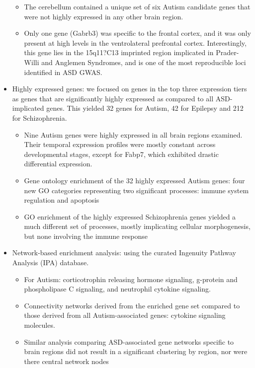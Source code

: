 \documentclass{report}
\begin{document}
\begin{itemize}
\begin{itemize}
		\item The cerebellum contained a unique set of six Autism candidate genes that were not highly expressed in any other brain region. 
		
		\item Only one gene (Gabrb3) was specific to the frontal cortex, and it was only present at high levels in the ventrolateral prefrontal cortex. Interestingly, this gene lies in the 15q11?C13 imprinted region implicated in Prader-Willi and Anglemen Syndromes, and is one of the most reproducible loci identified in ASD GWAS.
	\end{itemize}
	
	\item Highly expressed genes: we focused on genes in the top three expression tiers as genes that are significantly highly expressed as compared to all ASD-implicated genes. This yielded 32 genes for Autism, 42 for Epilepsy and 212 for Schizophrenia.
	\begin{itemize}
		\item Nine Autism genes were highly expressed in all brain regions examined. Their temporal expression profiles were mostly constant across developmental stages, except for Fabp7, which exhibited drastic differential expression.
		\item Gene ontology enrichment of the 32 highly expressed Autism genes: four new GO categories representing two significant processes: immune system regulation and apoptosis
		\item GO enrichment of the highly expressed Schizophrenia genes yielded a much different set of processes, mostly implicating cellular morphogenesis, but none involving the immune response
	\end{itemize}
	
	\item Network-based enrichment analysis: using the curated Ingenuity Pathway Analysis (IPA) database. 
	\begin{itemize}
		\item For Autism: corticotrophin releasing hormone signaling, g-protein and phospholipase C signaling, and neutrophil cytokine signaling. 
		\item Connectivity networks derived from the enriched gene set compared to those derived from all Autism-associated genes: cytokine signaling molecules. 
		\item Similar analysis comparing ASD-associated gene networks specific to brain regions did not result in a significant clustering by region, nor were there central network nodes 
	\end{itemize}
	

\end{itemize}
\end{document}
